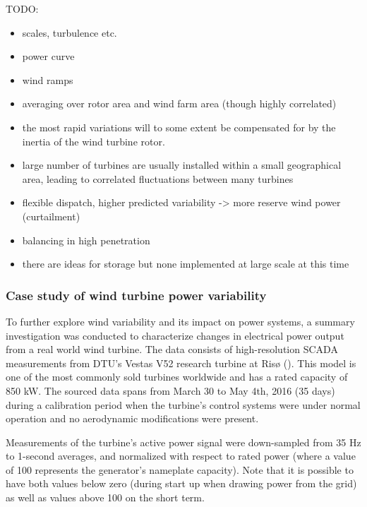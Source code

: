 TODO:
\begin{itemize}
\color{red}
    \item scales, turbulence etc.
    \item power curve
    \item wind ramps
    \item averaging over rotor area and wind farm area (though highly correlated)
    \item the most rapid variations will to some extent be compensated for by the inertia of the wind turbine rotor.
    \item large number of turbines are usually installed within a small geographical area, leading to correlated fluctuations between many turbines
    \item flexible dispatch, higher predicted variability -> more reserve wind power (curtailment)
    \item balancing in high penetration
    \item there are ideas for storage but none implemented at large scale at this time
\end{itemize}

\clearpage
\subsubsection{Case study of wind turbine power variability}
\label{sec:intro_intermittency_V52}

To further explore wind variability and its impact on power systems, a summary investigation was conducted to characterize changes in electrical power output from a real world wind turbine. The data consists of high-resolution SCADA measurements from DTU's Vestas V52 research turbine at Ris{\o} (\cite{dtu_v52}). This model is one of the most commonly sold turbines worldwide and has a rated capacity of 850 kW. The sourced data spans from March 30 to May 4th, 2016 (35 days) during a calibration period when the turbine's control systems were under normal operation and no aerodynamic modifications were present. 

Measurements of the turbine's active power signal were down-sampled from 35 Hz to 1-second averages, and normalized with respect to rated power (where a value of 100 represents the generator's nameplate capacity). Note that it is possible to have both values below zero (during start up when drawing power from the grid) as well as values above 100 on the short term.

